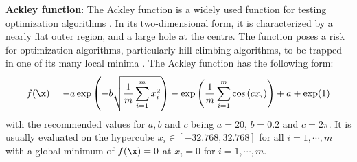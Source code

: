 \documentclass [PhD] {package/uclathes}
\begin{document}
\textbf{Ackley function}:
The Ackley function is a widely used function for testing optimization algorithms \parencite{adorio2005mvf, molga2005test}. In its two-dimensional form, it is characterized by a nearly flat outer region, and a large hole at the centre. The function poses a risk for optimization algorithms, particularly hill climbing algorithms, to be trapped in one of its many local minima \parencite{simulationlib}. The Ackley function has the following form:
\begin{equation*}
f(\x)=-a \exp \left(-b \sqrt{\frac{1}{m} \sum_{i=1}^m x_i^2}\right)-\exp \left(\frac{1}{m} \sum_{i=1}^m \cos \left(c x_i\right)\right)+a+\exp (1)
\end{equation*}
with the recommended values for $a,b$ and $c$ being $a = 20$, $b=0.2$ and $c = 2\pi$. It is usually evaluated on the hypercube $x_i \in [-32.768, 32.768]$ for all $i=1,\cdots,m$ with a global minimum of $f(\x)=0$ at $x_i = 0$ for $i=1,\cdots,m$.
\end{document}
